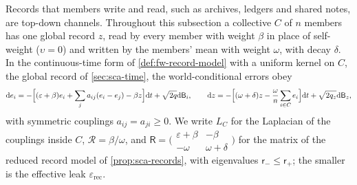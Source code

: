 Records that members write and read, such as archives, ledgers and shared notes, are top-down channels. Throughout this subsection a collective $C$ of $n$ members has one global record $z$, read by every member with weight $\beta$ in place of self-weight ($\upsilon=0$) and written by the members' mean with weight $\omega$, with decay $\delta$. In the continuous-time form of \cref{def:fw-record-model} with a uniform kernel on $C$, the global record of \cref{sec:sca-time}, the world-conditional errors obey
\begin{equation}\label{eq:hie-record}
\mathrm de_i=-\Bigl[(\varepsilon+\beta)e_i+\sum_ja_{ij}(e_i-e_j)-\beta z\Bigr]\mathrm dt+\sqrt{2q}\mathrm d\mathsf B_i,\qquad\mathrm dz=-\Bigl[(\omega+\delta)z-\frac\omega n\sum_{i\in C}e_i\Bigr]\mathrm dt+\sqrt{2q_z}\mathrm d\mathsf B_z,
\end{equation}
with symmetric couplings $a_{ij}=a_{ji}\ge0$. We write $L_C$ for the Laplacian of the couplings inside $C$, $\mathcal R=\beta/\omega$, and $\mathsf R=\bigl(\begin{smallmatrix}\varepsilon+\beta&-\beta\\-\omega&\omega+\delta\end{smallmatrix}\bigr)$ for the matrix of the reduced record model of \cref{prop:sca-records}, with eigenvalues $\mathsf r_-\le\mathsf r_+$; the smaller is the effective leak $\varepsilon_{\mathrm{rec}}$.

